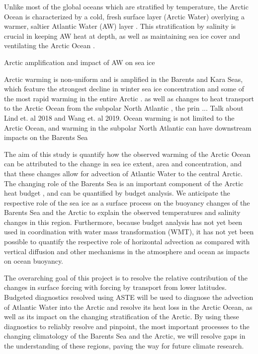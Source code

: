 \documentclass[a4paper,12pt]{article}
\begin{document}
        Unlike most of the global oceans which are stratified by temperature, the Arctic Ocean is characterized by a cold, fresh surface layer (Arctic Water) overlying a warmer, saltier Atlantic Water (AW) layer \cite{Carmack2007}. This stratification by salinity is crucial in keeping AW heat at depth, as well as maintaining sea ice cover and ventilating the Arctic Ocean \cite{Wang2020}.

        Arctic amplification and impact of AW on sea ice
        
        Arctic warming is non-uniform and is amplified in the Barents and Kara Seas, which feature the strongest decline in winter sea ice concentration and some of the most rapid warming in the entire Arctic \cite{Screen2010}.
        as well as changes to heat transport to the Arctic Ocean from the subpolar North Atlantic \cite{Wang2019}, the prin ...
        Talk about Lind et. al 2018 and Wang et. al 2019.
        Ocean warming is not limited to the Arctic Ocean, and warming in the subpolar North Atlantic can have downstream impacts on the Barents Sea 

        The aim of this study is quantify how the observed warming of the Arctic Ocean can be attributed to the change in sea ice extent, area and concentration, and that these changes allow for advection of Atlantic Water to the central Arctic. The changing role of the Barents Sea is an important component of the Arctic heat budget \cite{Arthun2016}, and can be quantified by budget analysis. We anticipate the respective role of the sea ice as a surface process on the buoyancy changes of the Barents Sea and the Arctic to explain the observed temperatures and salinity changes in this region. Furthermore, because budget analysis has not yet been used in coordination with water mass transformation (WMT), it has not yet been possible to quantify the respective role of horizontal advection as compared with vertical diffusion and other mechanisms in the atmosphere and ocean as impacts on ocean buoyancy.

        The overarching goal of this project is to resolve the relative contribution of the changes in surface forcing with forcing by transport from lower latitudes. Budgeted diagnostics resolved using ASTE will be used to diagnose the advection of Atlantic Water into the Arctic and resolve its heat loss in the Arctic Ocean, as well as its impact on the changing stratification of the Arctic. By using these diagnostics to reliably resolve and pinpoint, the most important processes to the changing climatology of the Barents Sea and the Arctic, we will resolve gaps in the understanding of these regions, paving the way for future climate research.
\end{document}
